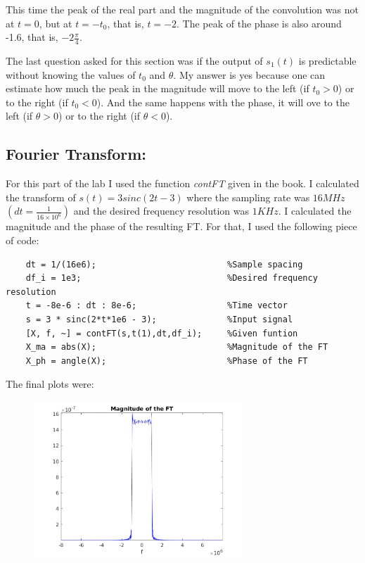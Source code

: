 \documentclass[a4paper,11pt]{article}
\begin{document}
This time the peak of the real part and the magnitude of the convolution was not at $t = 0$, but at $t = -t_{0}$, that is, $t = -2$. The peak of the phase is also around -1.6, that is, $-2\frac{\pi}{4}$.

The last question asked for this section was if the output of $s_{1}(t)$ is predictable without knowing the values of $t_{0}$ and $\theta$. My answer is yes because one can estimate how much the peak in the magnitude will move to the left (if $t_{0} > 0$) or to the right (if $t_{0} < 0$). And the same happens with the phase, it will ove to the left (if $\theta > 0$) or to the right (if $\theta < 0$).

\subsection{Fourier Transform:}

For this part of the lab I used the function \textit{contFT} given in the book. I calculated the transform of $s(t) = 3sinc(2t-3)$ where the sampling rate was $16MHz$ $(dt = \frac{1}{16\times 10^{6}})$ and the desired frequency resolution was $1 KHz$. I calculated the magnitude and the phase of the resulting FT. For that, I used the following piece of code:

\bigskip

\begin{lstlisting}
    dt = 1/(16e6);                          %Sample spacing
    df_i = 1e3;                             %Desired frequency resolution
    t = -8e-6 : dt : 8e-6;                  %Time vector
    s = 3 * sinc(2*t*1e6 - 3);              %Input signal
    [X, f, ~] = contFT(s,t(1),dt,df_i);     %Given funtion
    X_ma = abs(X);                          %Magnitude of the FT
    X_ph = angle(X);                        %Phase of the FT
\end{lstlisting}

\bigskip

The final plots were:

\begin{figure}[!hp]
    \begin{center}
      \includegraphics[width=0.7\textwidth]{images/exercice_4a.png}
    \end{center}
\end{figure}
\end{document}
